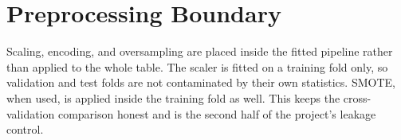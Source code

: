\section{Preprocessing Boundary}
Scaling, encoding, and oversampling are placed inside the fitted pipeline rather than applied to the whole table. The scaler is fitted on a training fold only, so validation and test folds are not contaminated by their own statistics. SMOTE, when used, is applied inside the training fold as well. This keeps the cross-validation comparison honest and is the second half of the project's leakage control.
